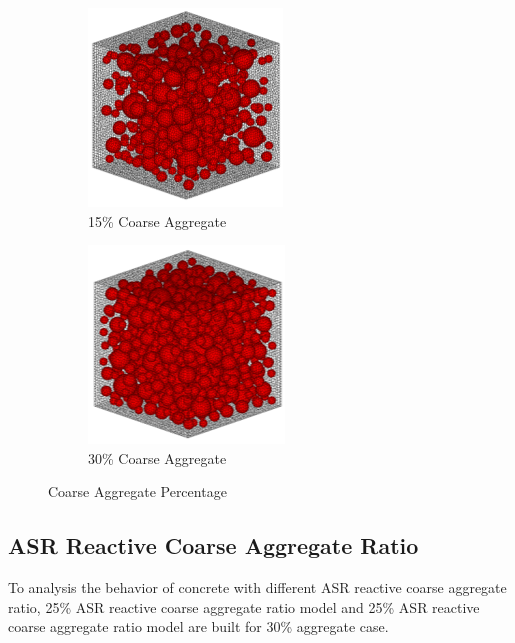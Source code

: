 \begin{figure}[ht!]
\centering
\begin{subfigure}{.5\textwidth}
  \centering
  \includegraphics[width=.4\linewidth]{Files/Aggregate/A15.png}
  \caption{15\% Coarse Aggregate}
  \label{fig:A15_model}
\end{subfigure}%
\begin{subfigure}{.5\textwidth}
  \centering
  \includegraphics[width=.4\linewidth]{Files/Aggregate/A30.png}
  \caption{30\% Coarse Aggregate}
  \label{fig:A30_model}
\end{subfigure}
\caption{Coarse Aggregate Percentage}
\label{fig:Aggregate_Percentage}
\end{figure}

\subsection{ASR Reactive Coarse Aggregate Ratio}

To analysis the behavior of concrete with different ASR reactive coarse aggregate ratio, 25\% ASR reactive coarse aggregate ratio model and 25\% ASR reactive coarse aggregate ratio model are built for 30\% aggregate case.

